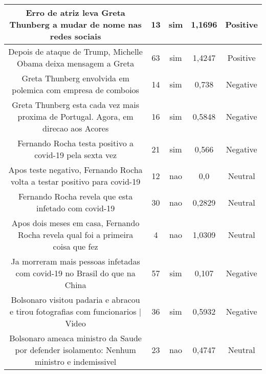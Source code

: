 \documentclass[11pt]{article}
\newlength\mylength
\begin{document}
\begin{center}
\begin{longtable}{||C{.40\mylength}||C{.20\mylength}||C{.20\mylength}||C{.30\mylength}||C{.20\mylength}||}
   Erro de atriz leva Greta Thunberg a mudar de nome nas redes sociais  & 13 & sim & 1,1696 & Positive \\  \hline
   Depois de ataque de Trump, Michelle Obama deixa mensagem a Greta  & 63 & sim & 1,4247 & Positive \\  \hline
   Greta Thunberg envolvida em polemica com empresa de comboios  & 14 & sim & 0,738 & Negative \\  \hline
   Greta Thunberg esta cada vez mais proxima de Portugal. Agora, em direcao aos Acores  & 16 & sim & 0,5848 & Negative \\  \hline
   Fernando Rocha testa positivo a covid-19 pela sexta vez  & 21 & sim & 0,566 & Negative \\  \hline
   Apos teste negativo, Fernando Rocha volta a testar positivo para covid-19  & 12 & nao & 0,0 & Neutral \\  \hline
   Fernando Rocha revela que esta infetado com covid-19  & 30 & nao & 0,2829 & Neutral \\  \hline
   Apos dois meses em casa, Fernando Rocha revela qual foi a primeira coisa que fez  & 4 & nao & 1,0309 & Neutral \\  \hline
   Ja morreram mais pessoas infetadas com covid-19 no Brasil do que na China  & 57 & sim & 0,107 & Negative \\  \hline
   Bolsonaro visitou padaria e abracou e tirou fotografias com funcionarios  | Video  & 36 & sim & 0,5932 & Negative \\  \hline
   Bolsonaro ameaca ministro da Saude por defender isolamento: Nenhum ministro e indemissivel  & 23 & nao & 0,4747 & Neutral \\  \hline

\end{longtable}
\end{center}
\end{document}
